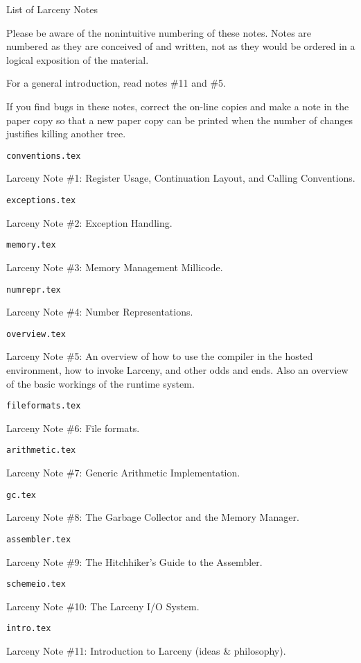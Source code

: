 



\bigskip
\centerline{\Large List of Larceny Notes}

\bigskip

Please be aware of the nonintuitive numbering of these notes. Notes
are numbered as they are conceived of and written, not as they would
be ordered in a logical exposition of the material.

For a general introduction, read notes \#11 and \#5.

If you find bugs in these notes, correct the on-line copies and make a note
in the paper copy so that a new paper copy can be printed when the number
of changes justifies killing another tree.

\begin{description}

\item {\tt conventions.tex}

Larceny Note \#1: Register Usage, Continuation Layout, and Calling Conventions.

\item {\tt exceptions.tex}

Larceny Note \#2: Exception Handling.

\item {\tt memory.tex}

Larceny Note \#3: Memory Management Millicode.

\item {\tt numrepr.tex}

Larceny Note \#4: Number Representations.

\item {\tt overview.tex}

Larceny Note \#5: An overview of how to use the compiler in the hosted
environment, how to invoke Larceny, and other odds and ends. Also an
overview of the basic workings of the runtime system.

\item {\tt fileformats.tex}

Larceny Note \#6: File formats.

\item {\tt arithmetic.tex}

Larceny Note \#7: Generic Arithmetic Implementation.

\item {\tt gc.tex}

Larceny Note \#8: The Garbage Collector and the Memory Manager.

\item {\tt assembler.tex}

Larceny Note \#9: The Hitchhiker's Guide to the Assembler.

\item {\tt schemeio.tex}

Larceny Note \#10: The Larceny I/O System.

\item {\tt intro.tex}

Larceny Note \#11: Introduction to Larceny (ideas \& philosophy).

\end{description}


